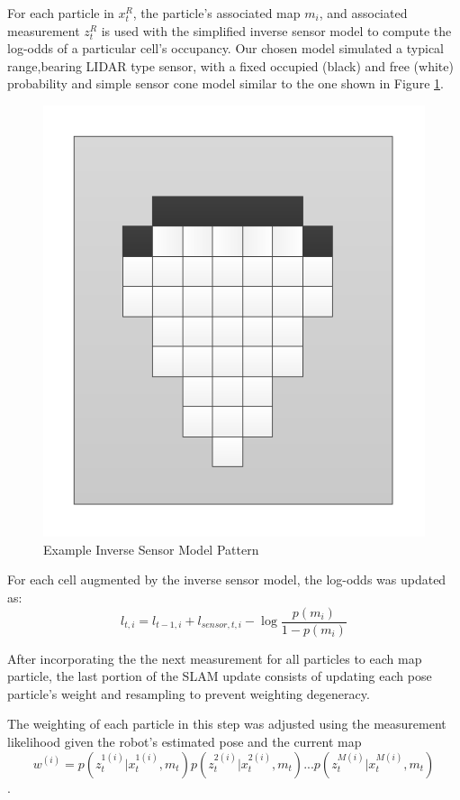 For each particle in $x_t^R$,  the particle's associated map $m_i$, and associated measurement $z_t^R$ is used with the simplified inverse sensor model to compute the log-odds of a particular cell’s occupancy. Our chosen model simulated a typical range,bearing LIDAR type sensor, with a fixed occupied (black) and free (white) probability and simple sensor cone model similar to the one shown in Figure \ref{fig:invsensor}.

\begin{figure}[ht]
\centering
\includegraphics[width=\columnwidth]{../FinalFigures/invsensormodel.pdf}
\caption{Example Inverse Sensor Model Pattern}
\label{fig:invsensor}
\end{figure}

For each cell augmented by the inverse sensor model, the log-odds was updated as:
$$l_{t,i}=l_{t-1,i}+l_{sensor,t,i}-\log\frac{p(m_i)}{1-p(m_i)}$$

After incorporating the the next measurement for all particles to each map particle, the last portion of the SLAM update consists of updating each pose particle’s weight and resampling to prevent weighting degeneracy.

The weighting of each particle in this step was adjusted using the measurement likelihood given the robot's estimated pose and the current map 
$$w^{(i)}=p(z_t^{1(i)}|x_t^{1(i)},m_t)p(z_t^{2(i)}|x_t^{2(i)},m_t)...p(z_t^{M(i)}|x_t^{M(i)},m_t)$$. 

